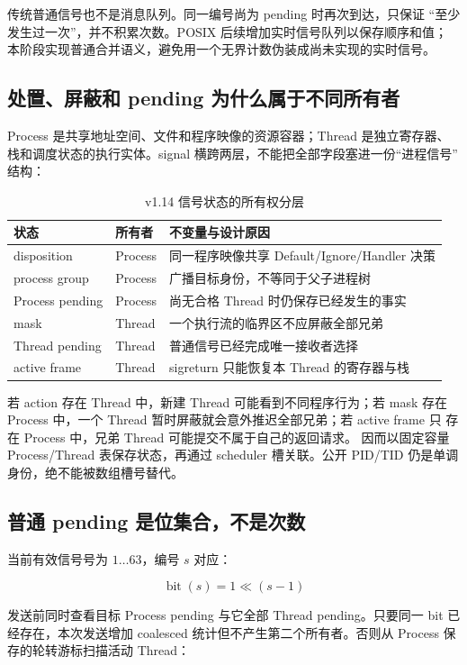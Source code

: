 传统普通信号也不是消息队列。同一编号尚为 pending 时再次到达，只保证
“至少发生过一次”，并不积累次数。POSIX 后续增加实时信号队列以保存顺序和值；
本阶段实现普通合并语义，避免用一个无界计数伪装成尚未实现的实时信号。

\subsection{处置、屏蔽和 pending 为什么属于不同所有者}

Process 是共享地址空间、文件和程序映像的资源容器；Thread 是独立寄存器、
栈和调度状态的执行实体。signal 横跨两层，不能把全部字段塞进一份“进程信号”
结构：

\begin{table}[htbp]
\centering
\small
\begin{tabularx}{\textwidth}{l l X}
\toprule
状态 & 所有者 & 不变量与设计原因\\
\midrule
disposition & Process & 同一程序映像共享 Default/Ignore/Handler 决策\\
process group & Process & 广播目标身份，不等同于父子进程树\\
Process pending & Process & 尚无合格 Thread 时仍保存已经发生的事实\\
mask & Thread & 一个执行流的临界区不应屏蔽全部兄弟\\
Thread pending & Thread & 普通信号已经完成唯一接收者选择\\
active frame & Thread & sigreturn 只能恢复本 Thread 的寄存器与栈\\
\bottomrule
\end{tabularx}
\caption{v1.14 信号状态的所有权分层}
\end{table}

若 action 存在 Thread 中，新建 Thread 可能看到不同程序行为；若 mask 存在
Process 中，一个 Thread 暂时屏蔽就会意外推迟全部兄弟；若 active frame 只
存在 Process 中，兄弟 Thread 可能提交不属于自己的返回请求。
 因而以固定容量 Process/Thread 表保存状态，再通过
scheduler 槽关联。公开 PID/TID 仍是单调身份，绝不能被数组槽号替代。

\subsection{普通 pending 是位集合，不是次数}

当前有效信号号为 \(1\ldots63\)，编号 \(s\) 对应：

\[
  \operatorname{bit}(s)=1\ll(s-1)
\]

发送前同时查看目标 Process pending 与它全部 Thread pending。只要同一 bit
已经存在，本次发送增加 coalesced 统计但不产生第二个所有者。否则从 Process
保存的轮转游标扫描活动 Thread：

